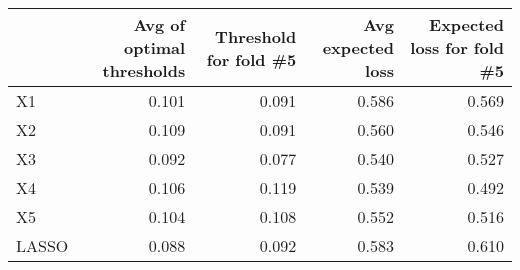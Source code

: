 
\begin{tabular}{lrrrr}
\toprule
  & Avg of optimal thresholds & Threshold for fold \#5 & Avg expected loss & Expected loss for fold \#5\\
\midrule
X1 & 0.101 & 0.091 & 0.586 & 0.569\\
X2 & 0.109 & 0.091 & 0.560 & 0.546\\
X3 & 0.092 & 0.077 & 0.540 & 0.527\\
X4 & 0.106 & 0.119 & 0.539 & 0.492\\
X5 & 0.104 & 0.108 & 0.552 & 0.516\\
LASSO & 0.088 & 0.092 & 0.583 & 0.610\\
\bottomrule
\end{tabular}